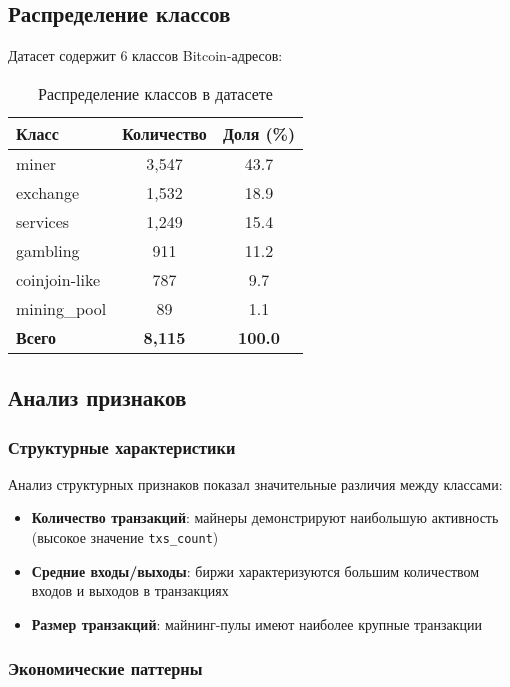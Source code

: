\subsection{Распределение классов}

Датасет содержит 6 классов Bitcoin-адресов:

\begin{table}[h]
\centering
\begin{tabular}{|l|c|c|}
\hline
\textbf{Класс} & \textbf{Количество} & \textbf{Доля (\%)} \\
\hline
miner & 3,547 & 43.7 \\
exchange & 1,532 & 18.9 \\
services & 1,249 & 15.4 \\
gambling & 911 & 11.2 \\
coinjoin-like & 787 & 9.7 \\
mining\_pool & 89 & 1.1 \\
\hline
\textbf{Всего} & \textbf{8,115} & \textbf{100.0} \\
\hline
\end{tabular}
\caption{Распределение классов в датасете}
\label{tab:class_distribution}
\end{table}

\subsection{Анализ признаков}

\subsubsection{Структурные характеристики}

Анализ структурных признаков показал значительные различия между классами:

\begin{itemize}
    \item \textbf{Количество транзакций}: майнеры демонстрируют наибольшую активность (высокое значение \texttt{txs\_count})
    \item \textbf{Средние входы/выходы}: биржи характеризуются большим количеством входов и выходов в транзакциях
    \item \textbf{Размер транзакций}: майнинг-пулы имеют наиболее крупные транзакции
\end{itemize}

\subsubsection{Экономические паттерны}

